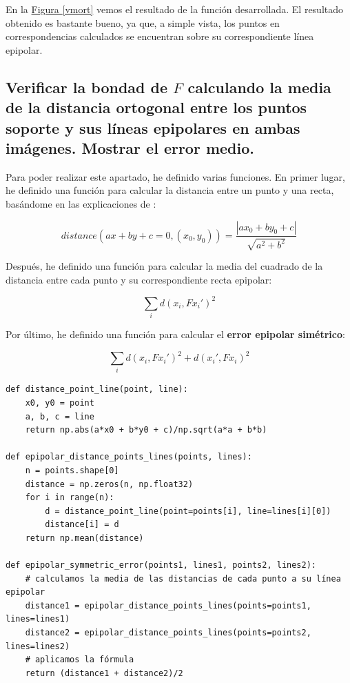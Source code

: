 \documentclass[11pt,a4paper]{article}
\theoremstyle{plain}
\theoremstyle{definition}
\begin{document}
En la \hyperref[vmort]{Figura \ref*{vmort}} vemos el resultado de la función desarrollada. El resultado obtenido es bastante bueno, ya que, a simple vista, los puntos en correspondencias calculados se encuentran sobre su correspondiente línea epipolar.

\subsection{Verificar la bondad de $F$ calculando la media de la distancia ortogonal entre los puntos soporte y sus líneas epipolares en ambas imágenes. Mostrar el error medio.}

Para poder realizar este apartado, he definido varias funciones. En primer lugar, he definido una función para calcular la distancia entre un punto y una recta, basándome en las explicaciones de \cite{wiki}:

\begin{displaymath}
distance(ax + by + c = 0, (x_0, y_0)) = \frac{\left| ax_0 + by_0 + c \right|}{\sqrt{a^2 + b^2}}
\end{displaymath}

Después, he definido una función para calcular la media del cuadrado de la distancia entre cada punto y su correspondiente recta epipolar:

\begin{displaymath}
\sum_i d(x_i, F x_i')^2
\end{displaymath}

Por último, he definido una función para calcular el \textbf{error epipolar simétrico}:

\begin{displaymath}
\sum_i d(x_i, F x_i')^2 + d(x_i', F x_i)^2
\end{displaymath}

\begin{verbatim}
def distance_point_line(point, line):
    x0, y0 = point
    a, b, c = line
    return np.abs(a*x0 + b*y0 + c)/np.sqrt(a*a + b*b)

def epipolar_distance_points_lines(points, lines):
    n = points.shape[0]
    distance = np.zeros(n, np.float32)
    for i in range(n):
        d = distance_point_line(point=points[i], line=lines[i][0])
        distance[i] = d
    return np.mean(distance)

def epipolar_symmetric_error(points1, lines1, points2, lines2):
    # calculamos la media de las distancias de cada punto a su línea epipolar
    distance1 = epipolar_distance_points_lines(points=points1, lines=lines1)
    distance2 = epipolar_distance_points_lines(points=points2, lines=lines2)
    # aplicamos la fórmula
    return (distance1 + distance2)/2
\end{verbatim}
\end{document}

